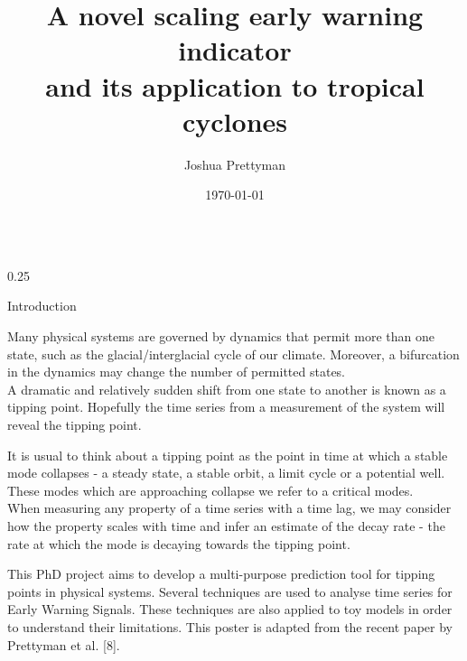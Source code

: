 \documentclass[10pt, final]{beamer}
\title[I like to make posters]{A novel scaling early warning indicator\\ and its application to tropical cyclones}
\author[T]{Joshua Prettyman}
\institute[SMS]{University of Reading\\ National Physical Laboratory}
\date{\today}
\begin{document}
\begin{frame}{} 
  \begin{columns}[T]
    \begin{column}{0.25\textwidth}
    		\begin{block}{Introduction}
    		
    		Many physical systems are governed by dynamics that permit more than one state, such as the glacial/interglacial cycle of our climate. Moreover, a bifurcation in the dynamics may change the number of permitted states. \\
    		\vspace{0.5cm}
    		A dramatic and relatively sudden shift from one state to another is known as a tipping point. Hopefully the time series from a measurement of the system will reveal the tipping point. \\
    		\vspace{0.5cm}
	
		It is usual to think about a tipping point as the point in time at which a stable mode collapses - a steady state, a stable orbit, a limit cycle or a potential well. These modes which are approaching collapse we refer to a critical modes. \\
    		\vspace{0.5cm}		
		When measuring any property of a time series with a time lag, we may consider how the property scales with time and infer an estimate of the decay rate - the rate at which the mode is decaying towards the tipping point. \\
    		\vspace{0.5cm}			
	
    		This PhD project aims to develop a multi-purpose prediction tool for tipping points in physical systems. Several techniques are used to analyse time series for Early Warning Signals.	 These techniques are also applied to toy models in order to understand their limitations. This poster is adapted from the recent paper by Prettyman et al. [8].
    		\end{block}  
    			
    
    


\end{column}
\end{columns}
\end{frame}
\end{document}
